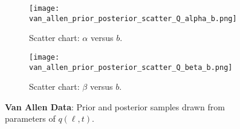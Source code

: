 \begin{figure*}[!htb]
  \centering
  \begin{subfigure}[b]{0.75\textwidth}
    \centering
    \texttt{[image: van\_allen\_prior\_posterior\_scatter\_Q\_alpha\_b.png]}
    \caption{ 
      {\small Scatter chart: $\alpha$ versus $b$. } 
    }
    \label{fig:alphavsbvanAllen}
  \end{subfigure}
  \hfill
  \begin{subfigure}[b]{0.75\textwidth}
    \centering
    \texttt{[image: van\_allen\_prior\_posterior\_scatter\_Q\_beta\_b.png]}
    \caption{
     {\small  Scatter chart: $\beta$ versus $b$.  }
    }
    \label{fig:betavsbvanAllen}
  \end{subfigure}
  \caption{
    \textbf{Van Allen Data}: Prior and posterior samples 
    drawn from parameters of $q(\ell, t)$.
  }
\end{figure*}
%
%
